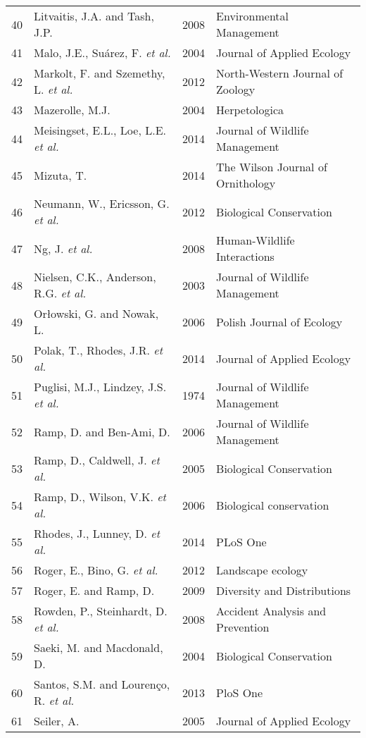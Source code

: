 \begin{longtable}[c]{@{}p{.75cm}p{6cm}p{1.25cm}p{5.5cm}@{}}
   40 & Litvaitis, J.A. and Tash, J.P. & 2008 & Environmental Management \\ 
   41 & Malo, J.E., Suárez, F. \textit{et al.} & 2004 & Journal of Applied Ecology \\ 
   42 & Markolt, F. and Szemethy, L. \textit{et al.} & 2012 & North-Western Journal of Zoology \\ 
   43 & Mazerolle, M.J. & 2004 & Herpetologica \\ 
   44 & Meisingset, E.L., Loe, L.E. \textit{et al.} & 2014 & Journal of Wildlife Management \\ 
   45 & Mizuta, T. & 2014 & The Wilson Journal of Ornithology \\ 
   46 & Neumann, W., Ericsson, G. \textit{et al.} & 2012 & Biological Conservation  \\ 
   47 & Ng, J. \textit{et al.} & 2008 & Human-Wildlife Interactions \\ 
   48 & Nielsen, C.K., Anderson, R.G. \textit{et al.} & 2003 & Journal of Wildlife Management \\ 
   49 & Orłowski, G. and Nowak, L. & 2006 & Polish Journal of Ecology \\ 
   50 & Polak, T., Rhodes, J.R. \textit{et al.} & 2014 & Journal of Applied Ecology \\ 
   51 & Puglisi, M.J., Lindzey, J.S. \textit{et al.} & 1974 & Journal of Wildlife Management \\ 
   52 & Ramp, D. and Ben-Ami, D. & 2006 & Journal of Wildlife Management \\ 
   53 & Ramp, D., Caldwell, J. \textit{et al.} & 2005 & Biological Conservation \\ 
   54 & Ramp, D., Wilson, V.K. \textit{et al.} & 2006 & Biological conservation \\ 
   55 & Rhodes, J., Lunney, D. \textit{et al.} & 2014 & PLoS One \\ 
   56 & Roger, E., Bino, G. \textit{et al.} & 2012 & Landscape ecology \\ 
   57 & Roger, E. and Ramp, D. & 2009 & Diversity and Distributions \\ 
   58 & Rowden, P., Steinhardt, D. \textit{et al.} & 2008 & Accident Analysis and Prevention  \\ 
   59 & Saeki, M. and Macdonald, D. & 2004 & Biological Conservation  \\ 
   60 & Santos, S.M. and Louren{\c{c}}o, R. \textit{et al.} & 2013 & PloS One \\ 
   61 & Seiler, A. & 2005 & Journal of Applied Ecology \\ 

\end{longtable}
